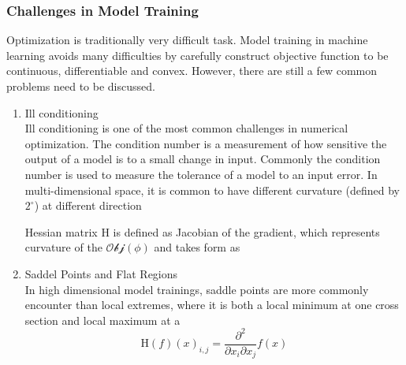 \subsubsection{Challenges in Model Training}

Optimization is traditionally very difficult task. Model training in machine learning avoids many difficulties by carefully construct objective function to be continuous, differentiable and convex. However, there are still a few common problems need to be discussed. 

\begin{enumerate}
    \item Ill conditioning\\
Ill conditioning is one of the most common challenges in numerical optimization. The condition number is a measurement of how sensitive the output of a model is to a small change in input. Commonly the condition number is used to measure the tolerance of a model to an input error.  In multi-dimensional space, it is common to have different curvature (defined by $2^\circ$) at different direction

Hessian matrix $\mathrm{H}$ is defined as Jacobian of the gradient, which represents curvature of the $\mathcal{Obj}(\phi)$ and takes form as 
    \item Saddel Points and Flat Regions\\
In high dimensional model trainings, saddle points are more commonly encounter than local extremes, where it is both a local minimum at one cross section and local maximum at a 
\begin{equation}
    \mathrm{H}(f)(x)_{i,j} = \frac{\partial^2}{\partial x_i \partial x_j}f(x)
\end{equation}
\end{enumerate}

